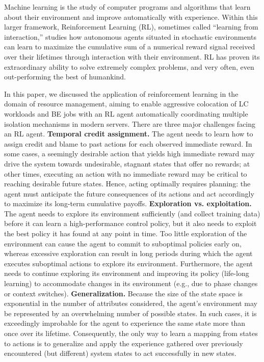 \begin{bigabstract}
Machine learning is the study of computer programs and algorithms that learn about their environment and improve automatically with experience. Within this larger framework, Reinforcement Learning (RL), sometimes called “learning from interaction,” studies how autonomous agents situated in stochastic environments can learn to maximize the cumulative sum of a numerical reward signal received over their lifetimes through interaction with their environment. RL has proven its extraordinary ability to solve extremely complex problems, and very often, even out-performing the best of humankind.

In this paper, we discussed the application of reinforcement learning in the domain of resource management, aiming to enable aggressive colocation of LC workloads and BE jobs with an RL agent automatically coordinating multiple isolation mechanisms in modern servers. There are three major challenges facing an RL agent. \textbf{Temporal credit assignment.} The agent needs to learn how to assign credit and blame to past actions for each observed immediate reward. In some cases, a seemingly desirable action that yields high immediate reward may drive the system towards undesirable, stagnant states that oﬀer no rewards; at other times, executing an action with no immediate reward may be critical to reaching desirable future states. Hence, acting optimally requires planning: the agent must anticipate the future consequences of its actions and act accordingly to maximize its long-term cumulative payoﬀs. \textbf{Exploration vs. exploitation.} The agent needs to explore its environment sufficiently (and collect training data) before it can learn a high-performance control policy, but it also needs to exploit the best policy it has found at any point in time. Too little exploration of the environment can cause the agent to commit to suboptimal policies early on, whereas excessive exploration can result in long periods during which the agent executes suboptimal actions to explore its environment. Furthermore, the agent needs to continue exploring its environment and improving its policy (life-long learning) to accommodate changes in its environment (e.g., due to phase changes or context switches). \textbf{Generalization.} Because the size of the state space is exponential in the number of attributes considered, the agent’s environment may be represented by an overwhelming number of possible states. In such cases, it is exceedingly improbable for the agent to experience the same state more than once over its lifetime. Consequently, the only way to learn a mapping from states to actions is to generalize and apply the experience gathered over previously encountered (but different) system states to act successfully in new states.

\end{bigabstract}